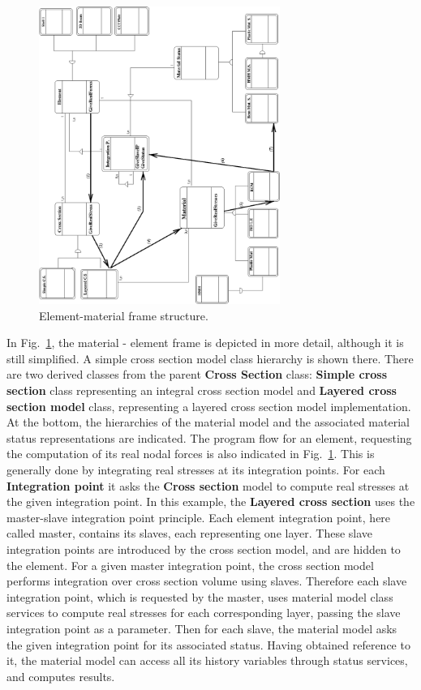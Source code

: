 \documentclass[a4paper]{article}
\newcommand{\class}[1]{{\bf #1}}
\begin{document}
\begin{figure}[tb]
\centerline{\includegraphics[angle=270, width=0.7\textwidth]{struct1.eps}}
\fi
\caption{Element-material frame  structure.}
\label{materelementFrame1}
\end{figure}


In Fig.~\ref{materelementFrame1}, the material - element frame is
depicted in more detail, although it is still simplified. A simple cross
section model class hierarchy is shown there. There are two 
derived classes from the parent \class{Cross Section} class: \class{Simple cross section}
class representing an integral cross section model and \class{Layered cross
section model} class, representing a layered cross section model
implementation. At the bottom,  the hierarchies of the material model and
the associated material status representations are indicated.
The program flow for an element, requesting the computation of its real nodal forces is also
indicated in Fig.~\ref{materelementFrame1}. This is generally done by integrating real stresses at its integration
points. For each \class{Integration point} it asks the \class{Cross section} model to
compute real stresses at the given integration point. In this example,
the \class{Layered cross section} uses the master-slave integration point
principle. Each element integration point, here called master,
contains its slaves, each representing one layer. These slave
integration points are introduced by the cross section model, and are
hidden to the element. For a given master integration point, the cross section
model performs integration  over cross section
volume using slaves. Therefore  each slave integration point, which is requested
by the master, uses material model class services to compute real
stresses for each corresponding layer, passing the slave integration point as
a parameter. Then for each slave, the material model asks the given integration
point for its associated status.  Having obtained reference to it,
the material model can access all its history variables through status
services, and computes results.
\end{document}

